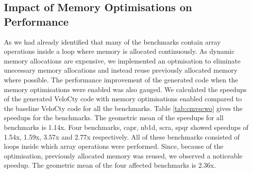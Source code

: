 \subsection{Impact of Memory Optimisations on Performance}
As we had already identified that many of the benchmarks contain array operations inside a loop where memory is allocated continuously. As dynamic memory allocations are expensive, we implemented an optmisation to eliminate unecessary memory allocations and instead reuse previously allocated memory where possible. The performance improvement of the generated code when the memory optimisations were enabled was also gauged. We calculated the speedups of the generated VeloCty code with memory optimisations enabled compared to the baseline VeloCty code for all the benchmarks. Table \ref{tab:cmvscwo} gives the speedups for the benchmarks. The geometric mean of the speedups for all benchmarks is 1.14x. Four benchmarks, \textsf{capr}, \textsf{nb1d}, \textsf{scra}, \textsf{spqr} showed speedups of 1.54x, 1.59x, 3.57x and 2.77x respectively. All of these benchmarks consisted of loops inside which array operations were performed. Since, because of the optimisation, previously allocated memory was reused, we observed a noticeable speedup. The geometric mean of the four affected benchmarks is 2.36x. 
